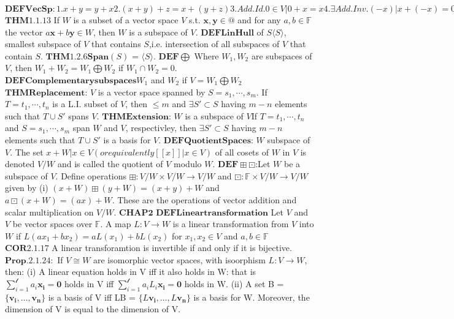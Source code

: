 \documentclass{article}
\theoremstyle{definition}
\begin{document}
{\fontsize{4}{5} \selectfont
$\mathbf{DEFVecSp}:1.x+y=y+x2.(x+y)+z = x+(y+z)3.Add.Id.0\in V | 0+x = x4. \exists Add.Inv. (-x) | x+(-x) = 0(5.) F.Dis.Law a(x+y) = ax + ay(6.) S.Dis.Law (a+b)(x) = ax + bx(7.)Mul.Id.1x=x(8.) (ab)x = a(bx)$
$\mathbf{THM1.1.13}$ If $W$ is a subset of a vector space $V$ s.t. $\mathbf{x,y} \in @$ and for any $a,b \in \mathbb{F} $ the vector $a \mathbf{x} + b \mathbf{y}  \in W$, then $W$ is a subspace of $V$.
$\mathbf{DEFLinHull}$ of $S \langle S \rangle$,  smallest subspace of $V$ that contains $S$,i.e. intersection of all subspaces of $V$ that contain $S$.
$\mathbf{THM1.2.6Span}(S)$ = $\langle S \rangle$.
$\mathbf{DEF}\bigoplus$ Where $W_1, W_2$ are subspaces of $V$, then $W_1 + W_2 = W_1 \bigoplus W_2 $ if $W_1 \cap W_2 = {0}.$
$\mathbf{DEF Complementary subspaces} W_1$ and $W_2$ if $V = W_1 \bigoplus W_2$
$\mathbf{THM Replacement}$: $V$ is a vector space spanned by $S = {s_1,\cdots,s_m}$. If $T = {t_1,\cdots,t_n}$ is a L.I. subset of $V$, then $\leq m$ and $\exists S' \subset S$ having $m-n$ elements such that $T\cup S'$ spans $V$.
$\mathbf{THM Extension}$: $W$ is a subspace of $V$If $T = {t_1,\cdots,t_n}$ and $S = {s_1,\cdots,s_m}$ span $W$ and $V$, respectivley, then $\exists S' \subset S$ having $m-n$ elements such that $T \cup S'$ is a basis for $V$.
$\mathbf{DEF Quotient Spaces}$: $W$ subspace of $V$. The set ${x+W | x \in V}(or equivalently [[ x ]] | x \in V)$ of all cosets of $W$ in $V$ is denoted $V/W$ and is called the quotient of $V$ modulo $W$.
$\mathbf{DEF} \boxplus \boxdot$:Let $W$ be a subspace of $V$. Define operations $\boxplus: V/W \times V/W \rightarrow V/W$ and $\boxdot : \mathbb{F} \times V/W \rightarrow V/W$ given by (i) $(x+W) \boxplus (y+W) = (x+y) + W$ and $a \boxdot(x+W) = (ax) + W$. These are the operations of vector addition and scalar multiplication on $V/W$.
$\mathbf{   CHAP2   } $
$\mathbf{DEF Linear transformation}$ Let $V$ and $V$ be vector spaces over $\mathbb{F} $. A map $L: V \rightarrow W$ is a linear transformation from $V$ into $W$ if $L(ax_1 + bx_2) = aL(x_1) + bL(x_2)$ for $x_1,x_2 \in V$ and $a,b \in \mathbb{F}$
$\mathbf{COR 2.1.17}$ A linear transforamtion is invertible if and only if it is bijective.
$\mathbf{Prop. 2.1.24: }$ If $V  \cong W$ are isomorphic vector spaces, with isoorphism $L:V \rightarrow W$, then: 
(i) A linear equation holds in V iff it also holds in W: that is $\sum_{i=1} ^\mathscr{l} a_i \mathbf{x_i} = \mathbf{0}$ holds in V iff $\sum_{i=1} ^\mathscr{l} a_i L_i \mathbf{x_i} = \mathbf{0}$ holds in W.
(ii) A set B = $\{\mathbf{v_i} ,\dots, \mathbf{ v_n}\}$ is a basis of V iff LB = $\{L\mathbf{v_i} ,\dots,L \mathbf{ v_n}\}$ is a basis for W. Moreover, the dimension of V is equal to the dimension of V.
}
\end{document}
